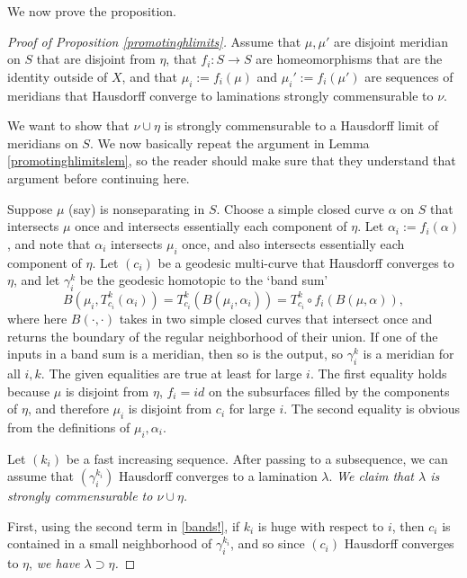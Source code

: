 \documentclass[12pt]{amsart}
\theoremstyle{definition}
\theoremstyle{remark}
\begin{document}
We now prove the proposition.

\begin{proof}[Proof of Proposition \ref{promotinghlimits}]
Assume that $\mu,\mu'$ are disjoint meridian on $S$ that are disjoint from $\eta$, that $f_i : S \longrightarrow S$ are homeomorphisms that are the identity outside of $X$, and that $\mu_i:=f_i(\mu)$ and $\mu_i':=f_i(\mu')$ are sequences of meridians that Hausdorff converge to laminations strongly commensurable to $\nu$.

We want to show that $\nu \cup \eta$ is strongly commensurable to a Hausdorff limit of meridians on $S$. We now basically repeat the argument in Lemma \ref{promotinghlimitslem}, so the reader should make sure that they understand that argument before continuing here. 


\medskip

Suppose $\mu$ (say) is nonseparating in $S$.
Choose a simple closed curve $\alpha$ on $S$ that intersects $\mu$ once and intersects essentially each component of $\eta$.  Let $\alpha_i := f_i(\alpha)$, and note that $\alpha_i$ intersects $\mu_i$ once, and also intersects essentially each component of $\eta$. Let $(c_i)$ be a geodesic multi-curve that Hausdorff converges to $\eta$, and let $\gamma_i^k$ be the geodesic homotopic to the `band sum' 
\begin{equation}
B(\mu_i,T_{c_{i}}^k(\alpha_i)) = T_{c_i}^k(B(\mu_i,\alpha_i)) = T_{c_i}^k \circ f_i( B(\mu,\alpha)),\label{bands!}
\end{equation} where here $B(\cdot,\cdot)$ takes in two simple closed curves that intersect once and returns the boundary of the regular neighborhood of their union. If one of the inputs in a band sum is a meridian, then so is the output, so $\gamma_i^k$ is a meridian for all $i,k$. The given equalities  are true at least for large $i$. The first equality holds because $\mu$ is disjoint from $\eta$, $f_i=id $ on the subsurfaces filled by the components of $\eta$, and therefore $\mu_i$ is disjoint from $c_i$ for large $i$. The second equality is obvious from the definitions of $\mu_i,\alpha_i$.

Let $(k_i)$ be a fast increasing sequence. After passing to a subsequence, we can assume that $(\gamma_i^{k_i})$ Hausdorff converges to a lamination $\lambda$. \it We claim that $\lambda$ is strongly commensurable to $\nu \cup \eta$. \rm

First, using the second term in \eqref{bands!}, if $k_i$ is huge with respect to $i$, then $c_i$ is contained in a small neighborhood of $\gamma_i^{k_i}$, and so since $(c_i)$ Hausdorff converges to $\eta$, \it we have $\lambda \supset \eta$.\rm


\end{proof}
\end{document}

